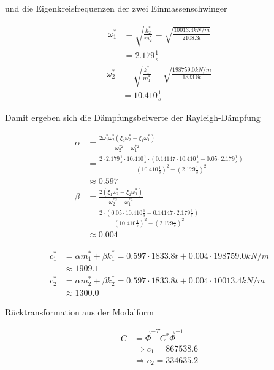 und die Eigenkreisfrequenzen der zwei Einmassenschwinger

\begin{align*}
\omega_1^* &= \sqrt{\frac{k_2^*}{m_2^*}} = \sqrt{\frac{10013.4 kN/m}{2108.3 t}}\\
           &= 2.179 \frac{1}{s}
\end{align*}
\begin{align*}
\omega_2^* &= \sqrt{\frac{k_1^*}{m_1^*}} = \sqrt{\frac{198759.0 kN/m}{1833.8 t}}\\
           &= 10.410 \frac{1}{s}
\end{align*}

Damit ergeben sich die Dämpfungsbeiwerte der Rayleigh-Dämpfung

\begin{align*}
\alpha &= \frac{2 \omega_1^* \omega_2^* (\xi_2 \omega_2^* - \xi_1 \omega_1^*)}{\omega_2^{*2} - \omega_1^{*2}}\\
       &= \frac{2 \cdot 2.179 \frac{1}{s} \cdot 10.410 \frac{1}{s} \cdot (0.14147 \cdot 10.410 \frac{1}{s} - 0.05 \cdot 2.179 \frac{1}{s})}{(10.410 \frac{1}{s})^2 - (2.179 \frac{1}{s})^2}\\
       &\approx 0.597\\[2em]
\beta  &= \frac{2 (\xi_1 \omega_2^* - \xi_2 \omega_1^*)}{\omega_2^{*2} - \omega_1^{*2}}\\
       &= \frac{2 \cdot (0.05 \cdot 10.410 \frac{1}{s} - 0.14147 \cdot 2.179 \frac{1}{s})}{(10.410 \frac{1}{s})^2 - (2.179 \frac{1}{s})^2}\\
       &\approx 0.004
\end{align*}

\begin{align*}
c_1^* &= \alpha m_1^* + \beta k_1^* = 0.597 \cdot 1833.8 t + 0.004 \cdot 198759.0 kN/m\\
      &\approx 1909.1\\
c_2^* &= \alpha m_2^* + \beta k_2^* = 0.597 \cdot 1833.8 t + 0.004 \cdot 10013.4 kN/m\\
      &\approx 1300.0
\end{align*}

Rücktransformation aus der Modalform

\begin{align*}
C &= \vec{\Phi}^{-T} C^* \vec{\Phi}^{-1}\\
  &\Rightarrow c_1 = 867538.6\\
  &\Rightarrow c_2 = 334635.2
\end{align*}


